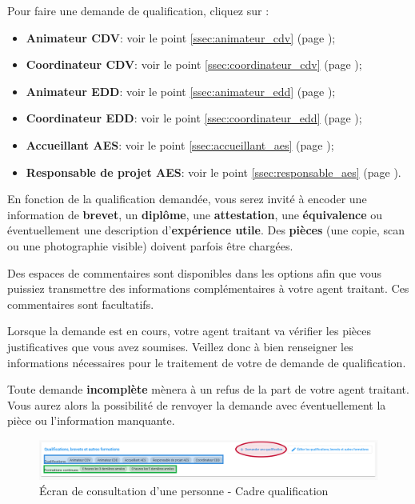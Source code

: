 Pour faire une demande de qualification, cliquez sur : 

\begin{itemize}
    \item \textbf{Animateur CDV}: voir le point \ref{ssec:animateur_cdv} (page \pageref{ssec:animateur_cdv});
    \item \textbf{Coordinateur CDV}: voir le point \ref{ssec:coordinateur_cdv} (page \pageref{ssec:coordinateur_cdv});
    \item \textbf{Animateur EDD}: voir le point \ref{ssec:animateur_edd} (page \pageref{ssec:animateur_edd});
    \item \textbf{Coordinateur EDD}: voir le point \ref{ssec:coordinateur_edd} (page \pageref{ssec:coordinateur_cdv});
    \item \textbf{Accueillant AES}:  voir le point \ref{ssec:accueillant_aes} (page \pageref{ssec:accueillant_aes});
    \item \textbf{Responsable de projet AES}:  voir le point \ref{ssec:responsable_aes} (page \pageref{ssec:responsable_aes}).
\end{itemize}

En fonction de la qualification demandée, vous serez invité à encoder une information de \textbf{brevet}, un \textbf{diplôme}, une \textbf{attestation}, une \textbf{équivalence} ou éventuellement une description d'\textbf{expérience utile}. Des \textbf{pièces} (une copie, scan ou une photographie visible) doivent parfois être chargées.

Des espaces de commentaires sont disponibles dans les options afin que vous puissiez transmettre des informations complémentaires à votre agent traitant. Ces commentaires sont facultatifs. 


\begin{remarque}\normalfont
Lorsque la demande est en cours, votre agent traitant va vérifier les pièces justificatives que vous avez soumises. Veillez donc à bien renseigner les informations nécessaires pour le traitement de votre de demande de qualification.

Toute demande \textbf{incomplète} mènera à un refus de la part de votre agent traitant. Vous aurez alors la possibilité de renvoyer la demande avec éventuellement la pièce ou l'information manquante. 
\end{remarque}



\begin{figure}[H]
    \centering
    \includegraphics[width=17cm]{Images/team/person-qualif.png}
    \caption{Écran de consultation d'une personne - Cadre qualification}
    \label{fig:personne_qualification}
\end{figure}



